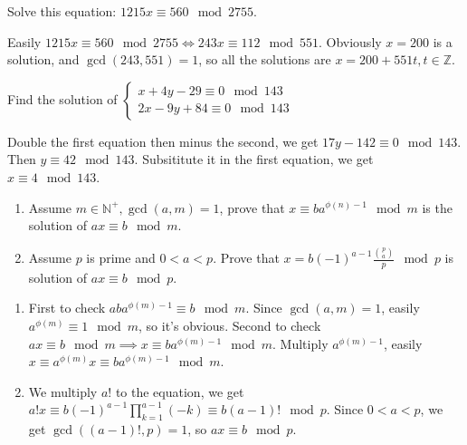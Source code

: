 \documentclass{ctexart}
\newif\ifpreface
\begin{document}
\large
\iffalse
  \setlength{\baselineskip}{1.2em}
  \ifpreface
    
  \else
    \maketitle
  \fi
\fi
{}
\begin{problem}\label{pro:p53.1ii}
  Solve this equation: \(1215x \equiv 560 \mod 2755\).
\end{problem}
\begin{solution}
  Easily \(1215x \equiv 560 \mod 2755 \iff 243 x \equiv 112 \mod 551 \).
  Obviously \(x=200\) is a solution, and \(\gcd(243,551)=1\), so all the solutions are
  \(x=200+551t,t \in \mathbb{Z}\).
\end{solution}
\begin{problem}\label{pro:p53.2}
  Find the solution of \(\begin{cases}
    x+4y-29\equiv 0 \mod 143 \\
    2x-9y+84 \equiv 0 \mod 143
  \end{cases}\)
\end{problem}
\begin{solution}
  Double the first equation then minus the second, we get \(17 y -142 \equiv 0 \mod 143\).
  Then \(y \equiv 42 \mod 143\).
  Subsititute it in the first equation, we get \(x \equiv 4 \mod 143\).
\end{solution}
\begin{problem}\label{pro:p53.3}
  \begin{enumerate}
    \item Assume \(m \in \mathbb{N}^+,\gcd(a,m)=1\), prove that
      \(x \equiv b a^{\phi(n)-1} \mod m\) is the solution of \(ax \equiv b \mod m\).
    \item Assume \(p\) is prime and \(0<a<p\). Prove that \(x=b(-1)^{a-1} \frac{\binom{p}{a}}{p} \mod p\) is solution of \(ax \equiv b \mod p\).
  \end{enumerate}
\end{problem}
\begin{solution}
  \begin{enumerate}
    \item First to check \(aba^{\phi(m)-1}\equiv b \mod m\).
      Since \(\gcd(a,m)=1\), easily \(a^{\phi(m)} \equiv 1 \mod m\), so it's obvious.
      Second to check \(ax \equiv b \mod m \implies x \equiv ba^{\phi(m)-1} \mod m\).
      Multiply \(a^{\phi(m)-1}\), easily \(x \equiv a^{\phi(m)} x \equiv b a^{\phi(m)-1} \mod m\).
    \item
      We multiply \(a!\) to the equation, we get \(a! x \equiv b(-1)^{a-1} \prod_{k=1}^{a-1} (-k) \equiv b (a-1)! \mod p\).
      Since \(0<a<p\), we get \(\gcd((a-1)!,p)=1\), so \(a x \equiv b \mod p\).
  \end{enumerate}
\end{solution}
\end{document}
